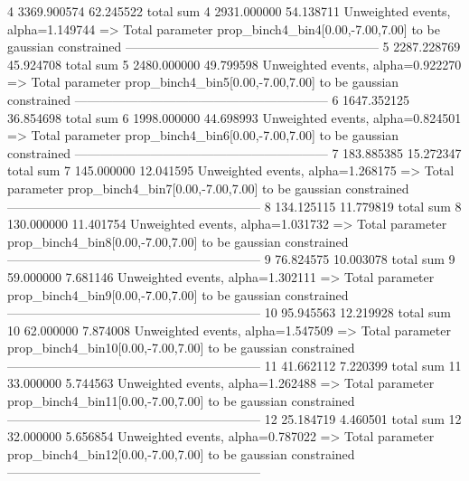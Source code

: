 4          3369.900574     62.245522       total sum                     
4          2931.000000     54.138711       Unweighted events, alpha=1.149744
  => Total parameter prop_binch4_bin4[0.00,-7.00,7.00] to be gaussian constrained
------------------------------------------------------------
5          2287.228769     45.924708       total sum                     
5          2480.000000     49.799598       Unweighted events, alpha=0.922270
  => Total parameter prop_binch4_bin5[0.00,-7.00,7.00] to be gaussian constrained
------------------------------------------------------------
6          1647.352125     36.854698       total sum                     
6          1998.000000     44.698993       Unweighted events, alpha=0.824501
  => Total parameter prop_binch4_bin6[0.00,-7.00,7.00] to be gaussian constrained
------------------------------------------------------------
7          183.885385      15.272347       total sum                     
7          145.000000      12.041595       Unweighted events, alpha=1.268175
  => Total parameter prop_binch4_bin7[0.00,-7.00,7.00] to be gaussian constrained
------------------------------------------------------------
8          134.125115      11.779819       total sum                     
8          130.000000      11.401754       Unweighted events, alpha=1.031732
  => Total parameter prop_binch4_bin8[0.00,-7.00,7.00] to be gaussian constrained
------------------------------------------------------------
9          76.824575       10.003078       total sum                     
9          59.000000       7.681146        Unweighted events, alpha=1.302111
  => Total parameter prop_binch4_bin9[0.00,-7.00,7.00] to be gaussian constrained
------------------------------------------------------------
10         95.945563       12.219928       total sum                     
10         62.000000       7.874008        Unweighted events, alpha=1.547509
  => Total parameter prop_binch4_bin10[0.00,-7.00,7.00] to be gaussian constrained
------------------------------------------------------------
11         41.662112       7.220399        total sum                     
11         33.000000       5.744563        Unweighted events, alpha=1.262488
  => Total parameter prop_binch4_bin11[0.00,-7.00,7.00] to be gaussian constrained
------------------------------------------------------------
12         25.184719       4.460501        total sum                     
12         32.000000       5.656854        Unweighted events, alpha=0.787022
  => Total parameter prop_binch4_bin12[0.00,-7.00,7.00] to be gaussian constrained
------------------------------------------------------------
